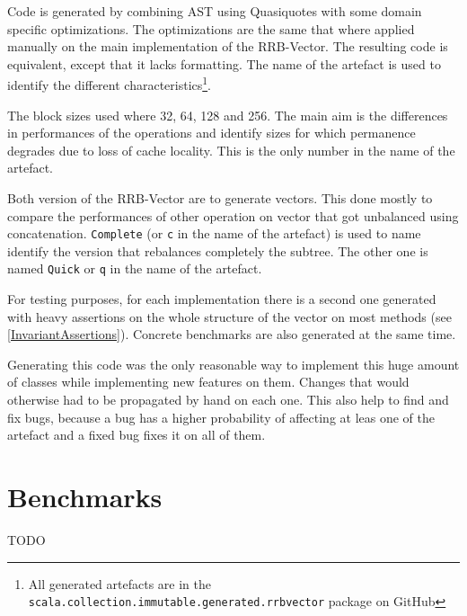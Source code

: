 Code is generated by combining AST using Quasiquotes with some domain specific optimizations. The optimizations are the same that where applied manually on the main implementation of the RRB-Vector. The resulting code is equivalent, except that it lacks formatting. The name of the artefact is used to identify the different characteristics\footnote{All generated artefacts are in the \texttt{scala.collection.immutable.generated.rrbvector} package on GitHub}.

The block sizes used where 32, 64, 128 and 256. 
The main aim is the differences in performances of the operations and identify sizes for which permanence degrades due to loss of cache locality. 
This is the only number in the name of the artefact.

Both version of the RRB-Vector are to generate vectors. 
This done mostly to compare the performances of other operation on vector that got unbalanced using concatenation. 
\texttt{Complete} (or \texttt{c} in the name of the artefact) is used to name identify the version that rebalances completely the subtree. 
The other one is named \texttt{Quick} or \texttt{q} in the name of the artefact.

For testing purposes, for each implementation there is a second one generated with heavy assertions on the whole structure of the vector on most methods (see \ref{InvariantAssertions}). 
Concrete benchmarks are also generated at the same time.

Generating this code was the only reasonable way to implement this huge amount of classes while implementing new features on them. 
Changes that would otherwise had to be propagated by hand on each one. 
This also help to find and fix bugs, because a bug has a higher probability of affecting at leas one of the artefact and a fixed bug fixes it on all of them.

\section{Benchmarks}
\color{red} TODO \color{black}

